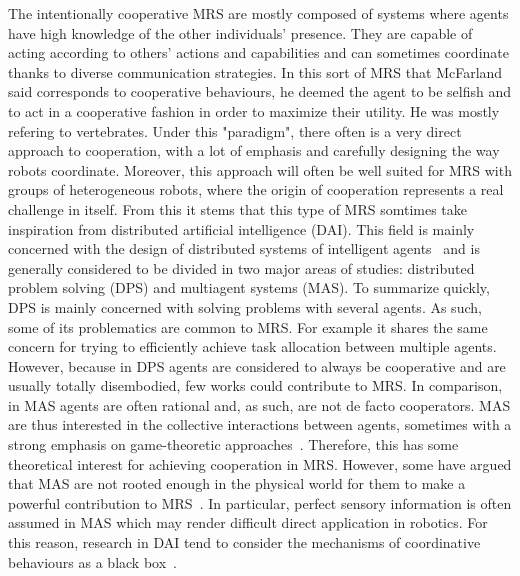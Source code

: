     The intentionally cooperative MRS are mostly composed of systems where agents have high knowledge of the other individuals' presence. They are capable of acting according to others' actions and capabilities and can sometimes coordinate thanks to diverse communication strategies. In this sort of MRS that McFarland said corresponds to cooperative behaviours, he deemed the agent to be selfish and to act in a cooperative fashion in order to maximize their utility. He was mostly refering to vertebrates. Under this "paradigm", there often is a very direct approach to cooperation, with a lot of emphasis and carefully designing the way robots coordinate. Moreover, this approach will often be well suited for MRS with groups of heterogeneous robots, where the origin of cooperation represents a real challenge in itself. From this it stems that this type of MRS somtimes take inspiration from distributed artificial intelligence (DAI). This field is mainly concerned with the design of distributed systems of intelligent agents~\cite{Cao1997, Panait2005} and is generally considered to be divided in two major areas of studies: distributed problem solving (DPS) and multiagent systems (MAS). To summarize quickly, DPS is mainly concerned with solving problems with several agents. As such, some of its problematics are common to MRS. For example it shares the same concern for trying to efficiently achieve task allocation between multiple agents. However, because in DPS agents are considered to always be cooperative and are usually totally disembodied, few works could contribute to MRS. In comparison, in MAS agents are often rational and, as such, are not de facto cooperators. MAS are thus interested in the collective interactions between agents, sometimes with a strong emphasis on game-theoretic approaches~\cite{Rosenschein1985}. Therefore, this has some theoretical interest for achieving cooperation in MRS. However, some have argued that MAS are not rooted enough in the physical world for them to make a powerful contribution to MRS~\cite{Cao1997, Farinelli2004}. In particular, perfect sensory information is often assumed in MAS which may render difficult direct application in robotics. For this reason, research in DAI tend to consider the mechanisms of coordinative behaviours as a black box~\cite{Parker1994}.



